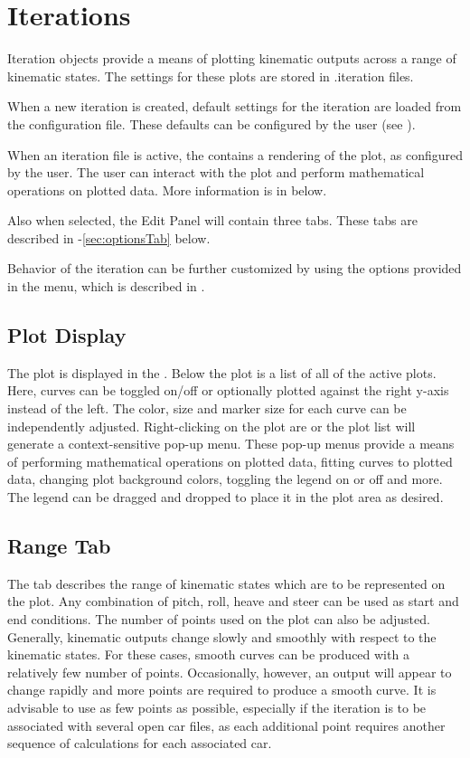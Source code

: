 \chapter{Iterations} \label{ch:iterations}

Iteration objects provide a means of plotting kinematic outputs across a range of kinematic states.  The settings for these plots are stored in .iteration files.

When a new iteration is created, default settings for the iteration are loaded from the configuration file.  These defaults can be configured by the user (see ).

When an iteration file is active, the  contains a rendering of the plot, as configured by the user.  The user can interact with the plot and perform mathematical operations on plotted data.  More information is in  below.

Also when selected, the Edit Panel will contain three tabs.  These tabs are described in -\ref{sec:optionsTab} below.

Behavior of the iteration can be further customized by using the options provided in the  menu, which is described in .

\section{Plot Display} \label{sec:plotDisplay}

The plot is displayed in the .  Below the plot is a list of all of the active plots.  Here, curves can be toggled on/off or optionally plotted against the right y-axis instead of the left.  The color, size and marker size for each curve can be independently adjusted.  Right-clicking on the plot are or the plot list will generate a context-sensitive pop-up menu.  These pop-up menus provide a means of performing mathematical operations on plotted data, fitting curves to plotted data, changing plot background colors, toggling the legend on or off and more.  The legend can be dragged and dropped to place it in the plot area as desired.

\section{Range Tab} \label{sec:rangeTab}

The  tab describes the range of kinematic states which are to be represented on the plot.  Any combination of pitch, roll, heave and steer can be used as start and end conditions.  The number of points used on the plot can also be adjusted.  Generally, kinematic outputs change slowly and smoothly with respect to the kinematic states.  For these cases, smooth curves can be produced with a relatively few number of points.  Occasionally, however, an output will appear to change rapidly and more points are required to produce a smooth curve.  It is advisable to use as few points as possible, especially if the iteration is to be associated with several open car files, as each additional point requires another sequence of calculations for each associated car.

